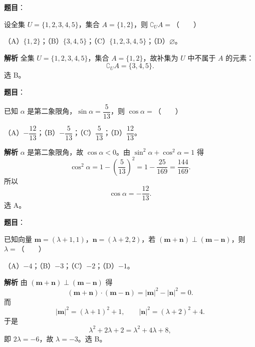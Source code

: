 

\begin{answer}

\textbf{题目}：

设全集 $U=\{1,2,3,4,5\}$，集合 $A=\{1,2\}$，则 $\complement_U A=$\mbox{（　　）}

（A）$\{1,2\}$；（B）$\{3,4,5\}$；（C）$\{1,2,3,4,5\}$；（D）$\varnothing$。

\textbf{解析}
全集 $U=\{1,2,3,4,5\}$，集合 $A=\{1,2\}$，故补集为 $U$ 中不属于 $A$ 的元素：
\nopagebreak[4]
\[\complement_U A=\{3,4,5\}.\]
选 B。


\end{answer}
\begin{answer}

\textbf{题目}：

已知 $\alpha$ 是第二象限角，$\sin\alpha=\dfrac5{13}$，则 $\cos\alpha=$\mbox{（　　）}

（A）$-\dfrac{12}{13}$；（B）$-\dfrac5{13}$；（C）$\dfrac5{13}$；（D）$\dfrac{12}{13}$。

\textbf{解析}
$\alpha$ 是第二象限角，故 $\cos\alpha<0$。由 $\sin^2\alpha+\cos^2\alpha=1$ 得
\nopagebreak[4]
\[\cos^2\alpha=1-\left(\frac5{13}\right)^2
=1-\frac{25}{169}=\frac{144}{169}.\]
所以
\nopagebreak[4]
\[\cos\alpha=-\frac{12}{13}.\]
选 A。


\end{answer}
\begin{answer}

\textbf{题目}：

已知向量 $\boldsymbol m=(\lambda+1,1)$，$\boldsymbol n=(\lambda+2,2)$，若 $(\boldsymbol m+\boldsymbol n)\perp(\boldsymbol m-\boldsymbol n)$，则 $\lambda=$\mbox{（　　）}

（A）$-4$；（B）$-3$；（C）$-2$；（D）$-1$。

\textbf{解析}
由 $(\boldsymbol m+\boldsymbol n)\perp(\boldsymbol m-\boldsymbol n)$ 得
\nopagebreak[4]
\[(\boldsymbol m+\boldsymbol n)\cdot(\boldsymbol m-\boldsymbol n)
=|\boldsymbol m|^2-|\boldsymbol n|^2=0.\]
而
\nopagebreak[4]
\[|\boldsymbol m|^2=(\lambda+1)^2+1,\qquad
|\boldsymbol n|^2=(\lambda+2)^2+4.\]
于是
\nopagebreak[4]
\[\lambda^2+2\lambda+2=\lambda^2+4\lambda+8,\]
即 $2\lambda=-6$，故 $\lambda=-3$。选 B。


\end{answer}
